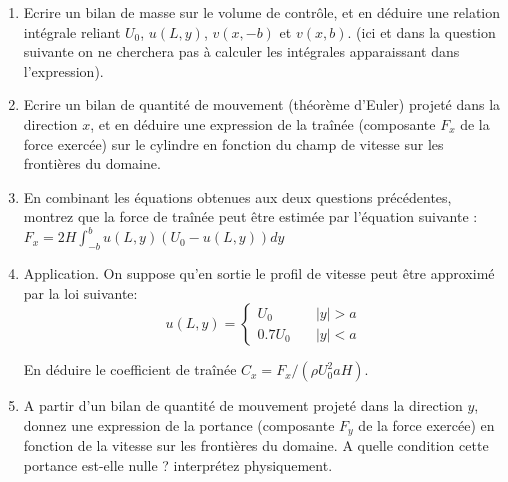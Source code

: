 \begin{enumerate}

\item Ecrire un bilan de masse sur le volume de contrôle, et en déduire une relation intégrale reliant $U_0$, $u(L,y)$, $v(x,-b)$ et $v(x,b)$.
(ici et dans la question suivante on ne cherchera pas à calculer les intégrales apparaissant dans l'expression).


\item Ecrire un bilan de quantité de mouvement (théorème d'Euler) projeté dans la direction $x$, et en déduire une expression de la traînée (composante $F_x$ de la force exercée) sur le cylindre en fonction du champ de vitesse sur les frontières du domaine.



\item En combinant les équations obtenues aux deux questions précédentes, montrez que la force de traînée peut être estimée par l'équation suivante :
$
F_x = 2 H \int_{-b}^{b} u(L,y) \left( U_0 - u(L,y) \right) dy 
$


\item
Application. On suppose qu'en sortie le profil de vitesse peut être approximé par la loi suivante: 
$$
u(L,y) = \left\{ \begin{array}{ll} U_0 \quad & |y|> a \\ 0.7 U_0 \quad & |y|< a \end{array}
\right.
$$

En déduire le coefficient de traînée $C_x = F_x / (\rho U_0^2 a H)$.


\item A partir d'un bilan de quantité de mouvement projeté dans la direction $y$, donnez une expression de la portance (composante $F_y$ de la force exercée) en fonction de la vitesse sur les frontières du domaine. A quelle condition cette portance est-elle nulle ? interprétez physiquement.


\end{enumerate}






